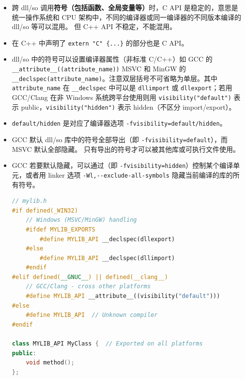 

\begin{itemize}
\item 跨 dll/so 调用\textbf{符号（包括函数、全局变量等）}时，C API 是稳定的，意思是统一操作系统和 CPU 架构中，不同的编译器或同一编译器的不同版本编译的 dll/so 等可以混用。 但 C++ API 不稳定，不能混用。
\item 在 C++ 中声明了 \verb`extern "C" {...}` 的部分也是 C API。
\item dll/so 中的符号可以设置编译器属性（非标准 C/C++）如 GCC 的 \verb`__attribute__((attribute_name))` MSVC 和 MinGW 的 \verb`__declspec(attribute_name)`。注意双层括号不可省略为单层。其中 \verb`attribute_name` 在 \verb`__declspec` 中可以是 \verb`dllimport` 或 \verb`dllexport`；若用 GCC/Clang 在非 Windows 系统跨平台使用则用 \verb`visibility("default")` 表示 public，\verb`visibility("hidden")` 表示 hidden（不区分 import/export）。
\item \verb`default/hidden` 是对应了编译器选项 \verb`-fvisibility=default/hidden`。
\item GCC 默认 dll/so 库中的符号全部导出（即 \verb`-fvisibility=default`），而 MSVC 默认全部隐藏。 只有导出的符号才可以被其他库或可执行文件使用。
\item GCC 若要默认隐藏，可以通过（即 \verb`-fvisibility=hidden`）控制某个编译单元，或者用 linker 选项 \verb`-Wl,--exclude-all-symbols` 隐藏当前编译的库的所有符号。
\begin{lstlisting}[language=cpp]
// mylib.h
#if defined(_WIN32)
    // Windows (MSVC/MinGW) handling
    #ifdef MYLIB_EXPORTS
        #define MYLIB_API __declspec(dllexport)
    #else
        #define MYLIB_API __declspec(dllimport)
    #endif
#elif defined(__GNUC__) || defined(__clang__)
    // GCC/Clang - cross other platforms
    #define MYLIB_API __attribute__((visibility("default")))
#else
    #define MYLIB_API  // Unknown compiler
#endif

class MYLIB_API MyClass {  // Exported on all platforms
public:
    void method();
};
\end{lstlisting}
\end{itemize}
